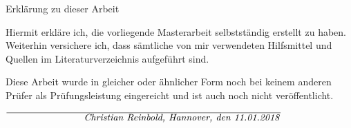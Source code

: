\vspace*{\fill}

\begin{flushright}
	\Huge Erklärung zu dieser Arbeit
\end{flushright}

\vspace{1cm}

Hiermit erkläre ich, die vorliegende Masterarbeit selbstständig erstellt zu haben. Weiterhin versichere ich, dass sämtliche von mir verwendeten Hilfsmittel und Quellen im Literaturverzeichnis aufgeführt sind.

Diese Arbeit wurde in gleicher oder ähnlicher Form noch bei keinem anderen Prüfer als Prüfungsleistung eingereicht und ist auch noch nicht veröffentlicht.

\vspace{2cm}

\begin{flushright}
	$\overline{\parbox{10cm}{\hfill\textit{\Student, Hannover, den \AbgabeDerArbeit}}}$
\end{flushright}

